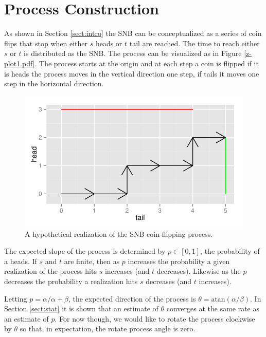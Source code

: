 \documentclass{article}
\begin{document}
\section{Process Construction} \label{sect:process_construction}

As shown in Section \ref{sect:intro} the SNB can be conceptualized as
a series of coin flips that stop when either $s$ heads or $t$ tail are
reached. The time to reach either $s$ or $t$ is distributed as the SNB.
The process can be visualized as in Figure \ref{z-plot1.pdf}. The process
starts at the origin and at each step a coin is flipped if it is heads
the process moves in the vertical direction one step, if tails it moves
one step in the horizontal direction.

\begin{figure}[ht]
\includegraphics[width=\textwidth]{z-plot1.pdf}
\caption{
A hypothetical realization of the SNB coin-flipping process.
}
\label{fig:z_plot}
\end{figure}

The expected slope of the process is determined by $p \in [0, 1]$, the 
probability of a heads. If $s$ and $t$ are finite, then as $p$ increases 
the probability a given realization of the process hits $s$ increases (and
$t$ decreases). Likewise as the $p$ decreases the probability a realization 
hits $s$ decreases (and $t$ increases).

Letting $p = \alpha / \alpha + \beta$, the expected direction of the 
process is $\theta = \text{atan}(\alpha / \beta)$. In Section \ref{sect:stat}
it is shown that an estimate of $\theta$ converges at the same rate as
an estimate of $p$. For now though, we would like to rotate the process
clockwise by $\theta$ so that, in expectation, the rotate process angle
is zero.
\end{document}
